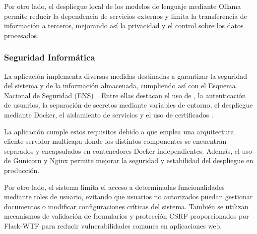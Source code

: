 Por otro lado, el despliegue local de los modelos de lenguaje mediante Ollama permite reducir la dependencia de servicios externos y limita la transferencia de información a terceros, mejorando así la privacidad y el control sobre los datos procesados.

\subsubsection{Seguridad Informática}\label{subsec:seg}

La aplicación implementa diversas medidas destinadas a garantizar la seguridad del sistema y de la información almacenada, cumpliendo así con el Esquema Nacional de Seguridad (ENS)~\cite{legal:ENS}. Entre ellas destacan el uso de , la autenticación de usuarios, la separación de secretos mediante variables de entorno, el despliegue mediante Docker, el aislamiento de servicios y el uso de certificados .

La aplicación cumple estos requisitos debido a que emplea una arquitectura cliente-servidor multicapa donde los distintos componentes se encuentran separados y encapsulados en contenedores Docker independientes. Además, el uso de Gunicorn y Nginx permite mejorar la seguridad y estabilidad del despliegue en producción.

Por otro lado, el sistema limita el acceso a determinadas funcionalidades mediante roles de usuario, evitando que usuarios no autorizados puedan gestionar documentos o modificar configuraciones críticas del sistema. También se utilizan mecanismos de validación de formularios y protección CSRF proporcionados por Flask-WTF para reducir vulnerabilidades comunes en aplicaciones web.

